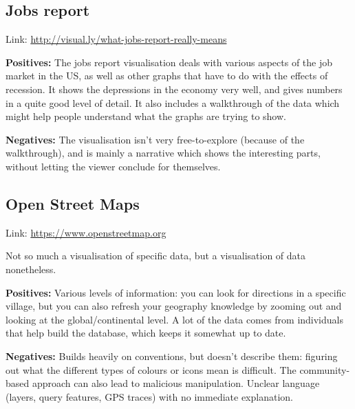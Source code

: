 \documentclass[a4paper]{article}
\begin{document}
\subsection*{Jobs report}

Link: \url{http://visual.ly/what-jobs-report-really-means}

\vspace{1em}
\noindent
\textbf{Positives:}
The jobs report visualisation deals with various aspects of the job market in the US, as well as other graphs that have to do with the effects of recession. It shows the depressions in the economy very well, and gives numbers in a quite good level of detail. It also includes a walkthrough of the data which might help people understand what the graphs are trying to show.

\vspace{1em}
\noindent
\textbf{Negatives:}
The visualisation isn't very free-to-explore (because of the walkthrough), and is mainly a narrative which shows the interesting parts, without letting the viewer conclude for themselves.

\subsection*{Open Street Maps}

Link: \url{https://www.openstreetmap.org}

\vspace{1em}
\noindent
Not so much a visualisation of specific data, but a visualisation of data nonetheless.

\vspace{1em}
\noindent
\textbf{Positives:}
Various levels of information: you can look for directions in a specific village, but you can also refresh your geography knowledge by zooming out and looking at the global/continental level. A lot of the data comes from individuals that help build the database, which keeps it somewhat up to date.

\vspace{1em}
\noindent
\textbf{Negatives:}
Builds heavily on conventions, but doesn't describe them: figuring out what the different types of colours or icons mean is difficult. The community-based approach can also lead to malicious manipulation. Unclear language (layers, query features, GPS traces) with no immediate explanation.
\end{document}
